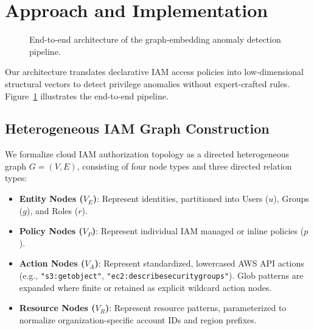\section{Approach and Implementation}
\label{sec:approach}

\begin{figure}[t]
\centering
{}
\caption{End-to-end architecture of the graph-embedding anomaly detection pipeline.}
\label{fig:pipeline}
\end{figure}

Our architecture translates declarative IAM access policies into low-dimensional structural vectors to detect privilege anomalies without expert-crafted rules. Figure~\ref{fig:pipeline} illustrates the end-to-end pipeline.

\subsection{Heterogeneous IAM Graph Construction}
We formalize cloud IAM authorization topology as a directed heterogeneous graph $G = (V, E)$, consisting of four node types and three directed relation types:
\begin{itemize}
    \item \textbf{Entity Nodes ($V_E$)}: Represent identities, partitioned into Users ($u$), Groups ($g$), and Roles ($r$).
    \item \textbf{Policy Nodes ($V_P$)}: Represent individual IAM managed or inline policies ($p$).
    \item \textbf{Action Nodes ($V_A$)}: Represent standardized, lowercased AWS API actions (e.g., \texttt{"s3:getobject"}, \texttt{"ec2:describesecuritygroups"}). Glob patterns are expanded where finite or retained as explicit wildcard action nodes.
    \item \textbf{Resource Nodes ($V_R$)}: Represent resource patterns, parameterized to normalize organization-specific account IDs and region prefixes.
\end{itemize}

